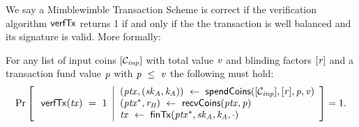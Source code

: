We say a Mimblewimble Transaction Scheme is correct if the verification algorithm $\mathsf{verfTx}$ returns 1 if and only if the the transaction is well
balanced and its signature is valid. More formally:
\begin{definition}
    \label{def:tx-scheme-correctness}
    For any list of input coins $[\mathcal{C}_{\mathit{inp}}]$ with total value $\mathit{v}$ and blinding factors
    $[\mathit{r}]$ and a transaction fund value $\mathit{p}$ with $\mathit{p} ~\leq~ \mathit{v}$ the following must hold:
    \[
        \Pr\left[
        \begin{array}{c}
            \: \mathsf{verfTx}(\mathit{tx}) ~=~ 1
        \end{array}
        \middle\vert
        \begin{array}{l}
            (\mathit{ptx}, (\mathit{sk}_{\mathit{A}}, \mathit{\mathit{k}_{\mathit{A}}})) ~\leftarrow~ \mathsf{spendCoins}([\mathcal{C}_{\mathit{inp}}],[\mathit{r}],\mathit{p},\mathit{v}) \\
            (\mathit{ptx}^*, \mathit{r}_{\mathit{B}}) ~\leftarrow~ \mathsf{recvCoins}(\mathit{ptx},\mathit{p})                                                          \\
            \mathit{tx} ~\leftarrow~ \mathsf{finTx}(\mathit{ptx}^*,\mathit{sk}_{\mathit{A}},\mathit{\mathit{k}_{\mathit{A}}},\cdot)
        \end{array}
        \right]=1.
    \]
\end{definition}

